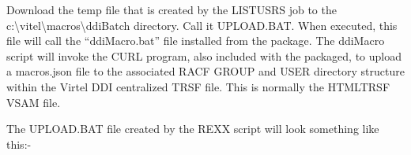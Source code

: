 \documentclass[letterpaper,10pt,english]{sphinxmanual}
\begin{document}
\begin{sphinxVerbatim}[commandchars=\\\{\}]
     
       
         
     
    
   
     
 
    
     
\end{sphinxVerbatim}

Download the temp file that is created by the LISTUSRS job to the c:\textbackslash{}vitel\textbackslash{}macros\textbackslash{}ddiBatch directory. Call it UPLOAD.BAT. When executed, this file will call the “ddiMacro.bat” file installed from the package. The ddiMacro script will invoke the CURL program, also included with the packaged, to upload a macros.json file to the associated RACF GROUP and USER directory structure within the Virtel DDI centralized TRSF file. This is normally the HTMLTRSF VSAM file.

The UPLOAD.BAT file created by the REXX script will look something like this:-
\end{document}
